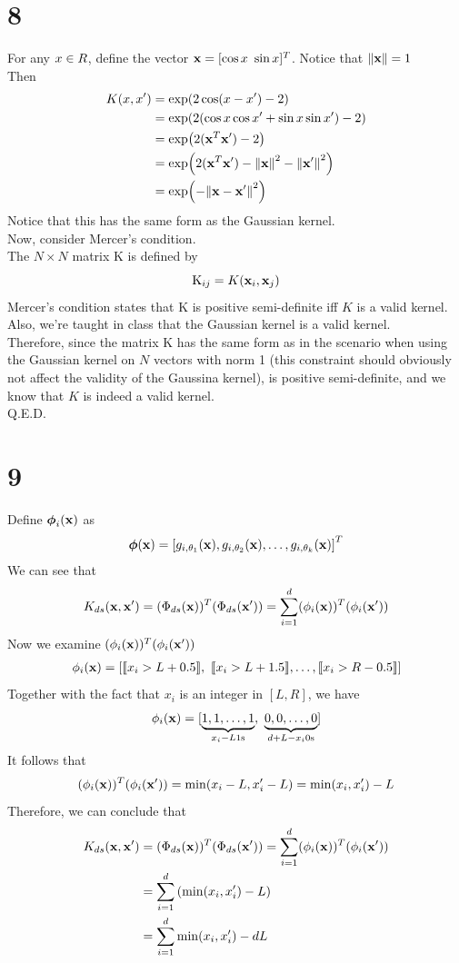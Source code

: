 \documentclass[11pt]{article}
\let\mathbb\relax
\theoremstyle{definition}
\begin{document}
\section*{8}
For any $x \in\mathbb{R}$, define the vector $\vb{x} = [\cos x\ \sin x]^T$. Notice that $\norm{\vb{x}} = 1$ \\
Then
\begin{align*}
  K(x, x^\prime) &= \exp(2\cos(x - x^\prime) - 2) \\ 
  &= \exp(2(\cos x\cos x^\prime + \sin x\sin x^\prime) - 2) \\ 
  &= \exp(2(\vb{x}^T\vb{x}^\prime) - 2) \\ 
  &= \exp(2(\vb{x}^T\vb{x}^\prime) - \norm{\vb{x}}^2 - \norm{\vb{x}^\prime}^2) \\ 
  &= \exp(-\norm{\vb{x} - \vb{x}^\prime}^2)
\end{align*}
Notice that this has the same form as the Gaussian kernel. \\
Now, consider Mercer's condition. \\
The $N\times N$ matrix K is defined by
\[
  \text{K}_{ij} = K(\vb{x}_i, \vb{x}_j)
\]
Mercer's condition states that K is positive semi-definite iff $K$ is a valid kernel. Also, we're taught in class that the Gaussian kernel is a valid kernel. \\ 
Therefore, since the matrix K has the same form as in the scenario when using the Gaussian kernel on $N$ vectors with norm 1 (this constraint should obviously not affect the validity of the Gaussina kernel),  is positive semi-definite, and we know that $K$ is indeed a valid kernel. \\ 
Q.E.D. \\
\newpage
\section*{9}
Define $\boldsymbol{\phi}_{i}(\vb{x})$ as
\[
  \boldsymbol{\phi}(\vb{x}) = \left[g_{i, \theta_1}(\vb{x}), g_{i, \theta_2}(\vb{x}),\dots, g_{i, \theta_k}(\vb{x})\right]^T
\]
We can see that
\[
  K_{ds}(\vb{x}, \vb{x}^\prime) = (\Phi_{ds}(\vb{x}))^T(\Phi_{ds}(\vb{x}^\prime)) = \sum^d_{i = 1}(\phi_i(\vb{x}))^T(\phi_i(\vb{x}^\prime))
\]
Now we examine $(\phi_i(\vb{x}))^T(\phi_i(\vb{x}^\prime))$
\begin{align*}
  \phi_i(\vb{x}) = \left[\llbracket x_i > L + 0.5\rrbracket,\ \llbracket x_i > L + 1.5\rrbracket,\dots,\llbracket x_i > R - 0.5\rrbracket\right]
\end{align*}
Together with the fact that $x_i$ is an integer in $[L, R]$, we have
\[
  \phi_i(\vb{x}) = [\underbrace{1, 1,\dots, 1}_{x_i - L \text{$1$s}}, \ \underbrace{0, 0,\dots, 0}_{d + L - x_i \text{$0$s}}]
\]
It follows that
\[
  (\phi_i(\vb{x}))^T(\phi_i(\vb{x}^\prime)) = \min(x_i - L, x_i^\prime - L) = \min(x_i, x^\prime_i) - L
\]
Therefore, we can conclude that
\begin{align*}
  K_{ds}(\vb{x}, \vb{x}^\prime) &= (\Phi_{ds}(\vb{x}))^T(\Phi_{ds}(\vb{x}^\prime)) = \sum^d_{i = 1}(\phi_i(\vb{x}))^T(\phi_i(\vb{x}^\prime)) \\
  &= \sum^d_{i = 1}\left(\min(x_i, x^\prime_i) - L\right) \\ 
  &= \sum^d_{i = 1}\min(x_i, x_i^\prime) - dL
\end{align*}
\newpage
\end{document}
